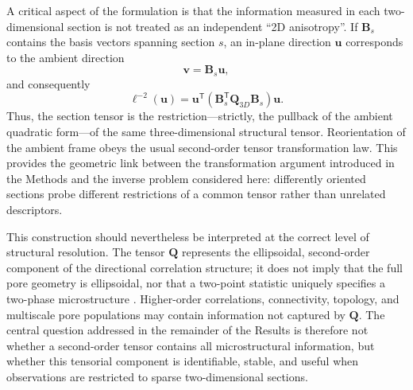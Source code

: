 \documentclass{article}
\begin{document}
A critical aspect of the formulation is that the information measured in each two-dimensional section is not treated as an independent ``2D anisotropy''. If $\mathbf{B}_{s}$ contains the basis vectors spanning section $s$, an in-plane direction $\mathbf{u}$ corresponds to the ambient direction
%
\begin{equation}
    \mathbf{v}=\mathbf{B}_{s}\mathbf{u},
\end{equation}
%
and consequently
%
\begin{equation}
    \ell^{-2}(\mathbf{u})
    =
    \mathbf{u}^{\mathsf T}
    \left(
    \mathbf{B}_{s}^{\mathsf T}
    \mathbf{Q}_{3D}
    \mathbf{B}_{s}
    \right)
    \mathbf{u}.
    \label{eq:results_section_form}
\end{equation}
%
Thus, the section tensor is the restriction---strictly, the pullback of the ambient quadratic form---of the same three-dimensional structural tensor. Reorientation of the ambient frame obeys the usual second-order tensor transformation law. This provides the geometric link between the transformation argument introduced in the Methods and the inverse problem considered here: differently oriented sections probe different restrictions of a common tensor rather than unrelated descriptors.

This construction should nevertheless be interpreted at the correct level of structural resolution. The tensor $\mathbf{Q}$ represents the ellipsoidal, second-order component of the directional correlation structure; it does not imply that the full pore geometry is ellipsoidal, nor that a two-point statistic uniquely specifies a two-phase microstructure \cite{Jiao2007}. Higher-order correlations, connectivity, topology, and multiscale pore populations may contain information not captured by $\mathbf{Q}$. The central question addressed in the remainder of the Results is therefore not whether a second-order tensor contains all microstructural information, but whether this tensorial component is identifiable, stable, and useful when observations are restricted to sparse two-dimensional sections.
\end{document}
